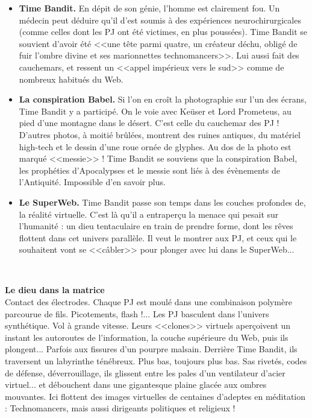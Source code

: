 \documentclass[11pt,twoside,a4paper]{book}
\begin{document}
\setlength\parindent{20pt}
\begin{itemize}
	\item \textbf{Time Bandit. }En d{\'e}pit de son g{\'e}nie, l'homme est clairement fou. Un m{\'e}decin peut d{\'e}duire qu'il d'est soumis {\`a} des exp{\'e}riences neurochirurgicales (comme celles dont les PJ ont {\'e}t{\'e} victimes, en plus pouss{\'e}es). Time Bandit se souvient d'avoir {\'e}t{\'e} <<une t{\^e}te parmi quatre, un cr{\'e}ateur d{\'e}chu, oblig{\'e} de fuir l'ombre divine et ses marionnettes technomancers>>. Lui aussi fait des cauchemars, et ressent un <<appel imp{\'e}rieux vers le sud>> comme de nombreux habitu{\'e}s du Web.
	\item \textbf{La conspiration Babel. }Si l'on en cro{\^i}t la photographie sur l'un des {\'e}crans, Time Bandit y a particip{\'e}. On le voie avec Ke{\"u}ser et Lord Prometeus, au pied d'une montagne dans le d{\'e}sert. C'est celle du cauchemar des PJ ! D'autres photos, {\`a} moiti{\'e} br{\^u}l{\'e}es, montrent des ruines antiques, du mat{\'e}riel high-tech et le dessin d'une roue orn{\'e}e de glyphes. Au dos de la photo est marqu{\'e} <<messie>> ! Time Bandit se souviens que la conspiration Babel, les proph{\'e}ties d'Apocalypses et le messie sont li{\'e}s {\`a} des {\'e}v{\`e}nements de l'Antiquit{\'e}. Impossible d'en savoir plus.
	\item \textbf{Le SuperWeb. }Time Bandit passe son temps dans les couches profondes de, la r{\'e}alit{\'e} virtuelle. C'est l{\`a} qu'il a entraper\c{c}u la menace qui pesait sur l'humanit{\'e} : un dieu tentaculaire en train de prendre forme, dont les r{\^e}ves flottent dans cet univers parall{\`e}le. Il veut le montrer aux PJ, et ceux qui le souhaitent vont se <<c{\^a}bler>> pour plonger avec lui dans le SuperWeb...
\end{itemize}~\\
\setlength\parindent{0pt}

\textbf{\large Le dieu dans la matrice}~\\

Contact des {\'e}lectrodes. Chaque PJ est moul{\'e} dans une combinaison polym{\`e}re parcourue de fils. Picotements, flash !... Les PJ basculent dans l'univers synth{\'e}tique. Vol {\`a} grande vitesse. Leurs <<clones>> virtuels aper\c{c}oivent un instant les autoroutes de l'information, la couche sup{\'e}rieure du Web, puis ils plongent... Parfois aux fissures d'un pourpre malsain. Derri{\`e}re Time Bandit, ils traversent un labyrinthe t{\'e}n{\'e}breux. Plus bas, toujours plus bas. Sas rivet{\'e}s, codes de d{\'e}fense, d{\'e}verrouillage, ils glissent entre les pales d'un ventilateur d'acier virtuel... et d{\'e}bouchent dans une gigantesque plaine glac{\'e}e aux ombres mouvantes. Ici flottent des images virtuelles de centaines d'adeptes en m{\'e}ditation : Technomancers, mais aussi dirigeants politiques et religieux !~\\
\end{document}
